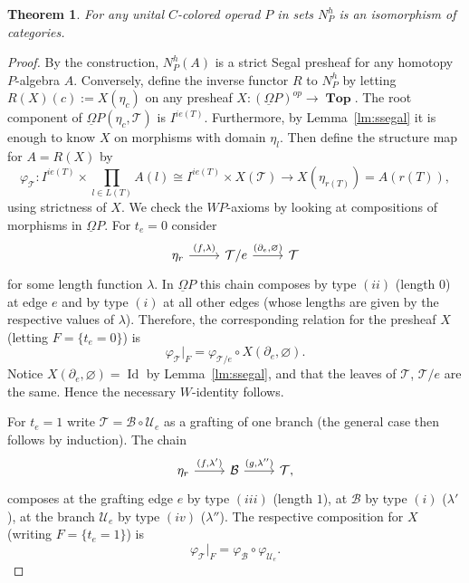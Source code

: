 \documentclass{amsart}
\newtheorem{theorem}[formula]{Theorem}
\theoremstyle{definition}
\theoremstyle{remark}
\newcommand{\lb}{\lbrace}
\newcommand{\rb}{\rbrace}
\DeclareMathOperator{\Id}{Id}
\DeclareMathOperator{\Top}{\mathbf{Top}}
\renewcommand{\phi}{\varphi}
\begin{document}
	\begin{theorem}\label{thm:halgdiag}
		For any unital $C$-colored operad $P$ in sets $N^{h}_{P}$ is an isomorphism of categories.
	\end{theorem}
	\begin{proof}
		By the construction, $N^{h}_{P}(A)$ is a strict Segal presheaf for any homotopy $P$-algebra $A$.
		Conversely, define the inverse functor $R$ to $N^{h}_{P}$ by letting $R(X)(c):=X(\eta_{c})$ on any presheaf $X\colon (\underline{\Omega} P)^{op}\to\Top$.
		The root component of  $\underline{\Omega}P(\eta_{c},\mathcal{T})$ is $I^{ie(T)}$.
		Furthermore, by Lemma~\ref{lm:ssegal} it is enough to know $X$ on
		morphisms with domain $\eta_l$.
		Then define the structure map for $A=R(X)$ by
		\[
			\phi_{\mathcal{T}}\colon
			I^{ie(T)}\times \prod\limits_{l\in L(T)} A(l)\cong		
			I^{ie(T)}\times X(\mathcal{T})\to 
			X(\eta_{r(T)})=A(r(T)),
		\]
		using strictness of $X$.
		We check the $WP$-axioms by looking at compositions of morphisms in $\underline{\Omega} P$.
		For $t_{e}=0$ consider 
		\[
			\begin{tikzcd}
				\eta_{r}\arrow{r}{(f,\lambda)} &
				\mathcal{T}/e\arrow{r}{(\partial_{e},\varnothing)} &
				\mathcal{T}			
			\end{tikzcd}
		\] 
		for some length function $\lambda$.
		In $\underline{\Omega} P$ this chain composes by type $(ii)$ (length $0$) at edge $e$ and by type $(i)$ at all other edges (whose lengths are given by the respective values of $\lambda$). 
		Therefore, the corresponding relation for the presheaf $X$ (letting $F=\lb t_{e}=0\rb$) is
		\[
			\phi_{\mathcal{T}}|_{F}=
			\phi_{\mathcal{T}/e}\circ X(\partial_{e},\varnothing).
		\]
		Notice $X(\partial_{e},\varnothing)=\Id$ by Lemma~\ref{lm:ssegal}, and that the leaves of $\mathcal{T}$, $\mathcal{T}/e$ are the same.
		Hence the necessary $W$-identity follows.
		
		For $t_{e}=1$ write $\mathcal{T}=\mathcal{B}\circ \mathcal{U}_{e}$ as a grafting of one branch (the general case then follows by induction).
		The chain
		\[
		\begin{tikzcd}
			\eta_{r}\arrow{r}{(f,\lambda')} &
			\mathcal{B}\arrow{r}{(g,\lambda'')} &
			\mathcal{T},
		\end{tikzcd}
		\] 
		composes at the grafting edge $e$ by type $(iii)$ (length $1$), at $\mathcal{B}$ by type $(i)$ ($\lambda'$), at the branch $\mathcal{U}_{e}$ by type $(iv)$ ($\lambda''$).
		The respective composition for $X$ (writing $F=\lb t_{e}=1\rb$) is
		\[
			\phi_{\mathcal{T}}|_{F}=
			\phi_{\mathcal{B}}\circ \phi_{\mathcal{U}_{e}}.
		\]


\end{proof}
\end{document}
